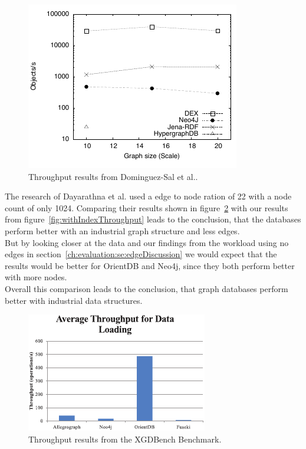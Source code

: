 \begin{figure}[!h]
  \centering
  \includegraphics[width=.8\textwidth]{images/benchmarks/ShenResultsInsert}
  \caption{Throughput results from Dominguez-Sal et al.\cite{TaoShen}.}
  \label{fig:throughputShen}
\end{figure}

The research of Dayarathna et al.\cite{Dayarathna2012} used a edge to node ration of 22 with a node count of only 1024.
Comparing their results shown in figure~\ref{fig:throughputXGDBench} with our results from figure~\ref{fig:withIndexThroughput} leads to the conclusion,
that the databases perform better with an industrial graph structure and less edges.\\
But by looking closer at the data and our findings from the workload using no edges in section~\ref{ch:evaluation:se:edgeDiscussion} we would expect that the results would be better for OrientDB and Neo4j, since they both perform better with more nodes.\\
Overall this comparison leads to the conclusion,
that graph databases perform better with industrial data structures.

\begin{figure}[!h]
  \centering
  \includegraphics[width=\textwidth]{images/benchmarks/XGDBenchResultsInsert}
  \caption{Throughput results from the XGDBench Benchmark\cite{Dayarathna2012}.}
  \label{fig:throughputXGDBench}
\end{figure}

